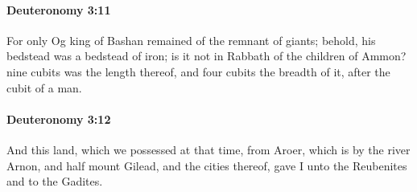 		\paragraph{Deuteronomy 3:11} %
			\label{DEUTERONOMY-3-11}

			For only Og king of Bashan remained of the remnant of giants; behold, his bedstead was a bedstead of iron; is it not in Rabbath of the children of Ammon? nine cubits was the length thereof, and four cubits the breadth of it, after the cubit of a man.


		\paragraph{Deuteronomy 3:12} %
			\label{DEUTERONOMY-3-12}

			And this land, which we possessed at that time, from Aroer, which is by the river Arnon, and half mount Gilead, and the cities thereof, gave I unto the Reubenites and to the Gadites.

